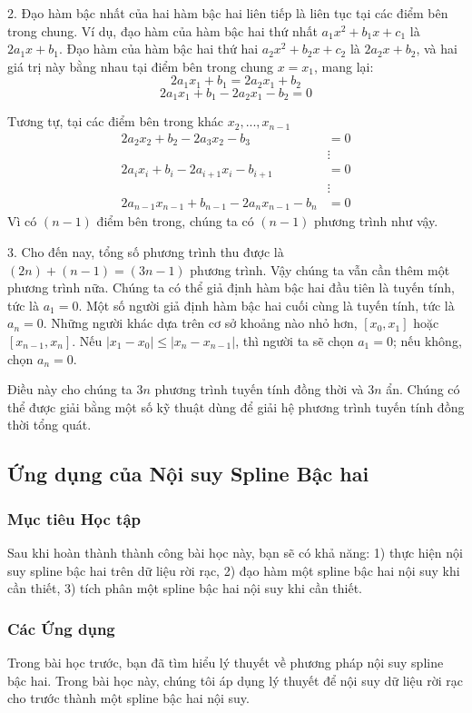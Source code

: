 2. Đạo hàm bậc nhất của hai hàm bậc hai liên tiếp là liên tục tại các điểm bên trong chung. Ví dụ, đạo hàm của hàm bậc hai thứ nhất $a_{1}x^{2}+b_{1}x+c_{1}$ là $2a_{1}x+b_{1}$. Đạo hàm của hàm bậc hai thứ hai $a_{2}x^{2}+b_{2}x+c_{2}$ là $2a_{2}x+b_{2}$, và hai giá trị này bằng nhau tại điểm bên trong chung $x=x_{1}$, mang lại:
$$2a_{1}x_{1}+b_{1}=2a_{2}x_{1}+b_{2}$$
$$2a_{1}x_{1}+b_{1}-2a_{2}x_{1}-b_{2}=0$$

Tương tự, tại các điểm bên trong khác $x_{2},...,x_{n-1}$
\begin{align}
2a_2x_2 + b_2 - 2a_3x_2 - b_3 &= 0 \nonumber \\
&\vdots \nonumber \\
2a_ix_i + b_i - 2a_{i+1}x_i - b_{i+1} &= 0 \\
&\vdots \nonumber \\
2a_{n-1}x_{n-1} + b_{n-1} - 2a_nx_{n-1} - b_n &= 0 \nonumber
\end{align}
Vì có $(n-1)$ điểm bên trong, chúng ta có $(n-1)$ phương trình như vậy.

3. Cho đến nay, tổng số phương trình thu được là $(2n)+(n-1)=(3n-1)$ phương trình. Vậy chúng ta vẫn cần thêm một phương trình nữa. Chúng ta có thể giả định hàm bậc hai đầu tiên là tuyến tính, tức là $a_{1}=0$. Một số người giả định hàm bậc hai cuối cùng là tuyến tính, tức là $a_{n}=0$.
Những người khác dựa trên cơ sở khoảng nào nhỏ hơn, $[x_{0},x_{1}]$ hoặc $[x_{n-1},x_{n}]$. Nếu $|x_{1}-x_{0}|\le|x_{n}-x_{n-1}|$, thì người ta sẽ chọn $a_{1}=0$; nếu không, chọn $a_{n}=0$.

Điều này cho chúng ta $3n$ phương trình tuyến tính đồng thời và $3n$ ẩn. Chúng có thể được giải bằng một số kỹ thuật dùng để giải hệ phương trình tuyến tính đồng thời tổng quát.

\subsection{Ứng dụng của Nội suy Spline Bậc hai}

\subsubsection{Mục tiêu Học tập}
Sau khi hoàn thành thành công bài học này, bạn sẽ có khả năng:
1) thực hiện nội suy spline bậc hai trên dữ liệu rời rạc,
2) đạo hàm một spline bậc hai nội suy khi cần thiết,
3) tích phân một spline bậc hai nội suy khi cần thiết.

\subsubsection{Các Ứng dụng}
Trong bài học trước, bạn đã tìm hiểu lý thuyết về phương pháp nội suy spline bậc hai. Trong bài học này, chúng tôi áp dụng lý thuyết để nội suy dữ liệu rời rạc cho trước thành một spline bậc hai nội suy.


